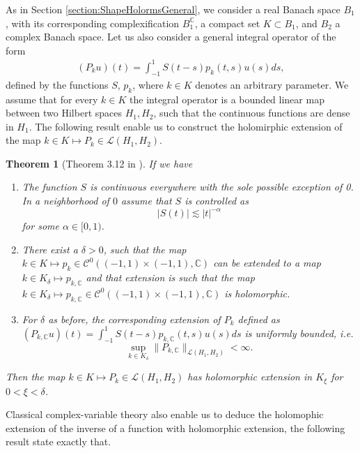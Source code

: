 \documentclass{article}
\newtheorem{theorem}{Theorem}[section]
\newcommand{\IC}{{\mathbb C}}
\newcommand{\cmspace}[3]{\mathcal{C}^{#1} \left( #2, #3 \right)}
\begin{document}
As in Section \ref{section:ShapeHolormsGeneral}, we consider a real Banach space $B_1$, with its corresponding complexification $B_1^{\IC}$, a compact set $K \subset B_1$, and $B_2$ a complex Banach space. Let us also consider a general integral operator of the form 
\begin{align*}
(P_k u)(t) = \int_{-1}^{1} S(t-s) p_k(t,s) u(s) ds,
\end{align*}
defined by the functions $S$, $p_k$, where $k \in K$ denotes an arbitrary parameter. We assume that for every $k \in K$ the integral operator is a bounded linear map between two Hilbert spaces $H_1,H_2$, such that the continuous functions are dense in $H_1$. The following result enable us to construct the holomirphic extension of the map $k  \in K \mapsto P_k \in \mathcal{L}(H_1,H_2)$. 

\begin{theorem}[Theorem 3.12 in \cite{Henriquez2021}] \label{thrm:abstractholm}
If we have 
\begin{enumerate}
\item 
The function $S$ is continuous everywhere with the sole possible  exception of 0. In a neighborhood of $0$ assume that $S$ is controlled as 
$$|S(t)| \lesssim| t|^{-\alpha}$$
for some $\alpha \in [0,1)$. 
\item 
There exist a $\delta >0$, such that the map $k \in K \mapsto p_k \in \cmspace{0}{(-1,1)\times(-1,1)}{\IC}$ can be extended to a map $k \in K_\delta \mapsto p_{k,\IC}$ and that extension is such that 
the map $k \in K_\delta \mapsto p_{k,\IC } \in \cmspace{0}{(-1,1)\times(-1,1)}{\IC}$ is holomorphic. 
\item 
For $\delta$ as before, the corresponding extension of $P_k$ defined as $(P_{k,\IC}u)(t) = \int_{-1}^{1} S(t-s) p_{k,\IC}(t,s) u(s) ds$ is uniformly bounded, i.e. 
$$ \sup_{k \in K_\delta} \| P_{k,\IC} \|_{\mathcal{L}(H_1,H_2)}< \infty.$$
\end{enumerate}
Then the map $k \in K \mapsto P_{k} \in \mathcal{L}(H_1,H_2)$ has holomorphic extension in $K_\xi$ for $0<\xi < \delta$.
\end{theorem}
Classical complex-variable theory also enable us to deduce the holomophic extension of the inverse of a function with holomorphic extension, the following result state exactly that.
\end{document}

